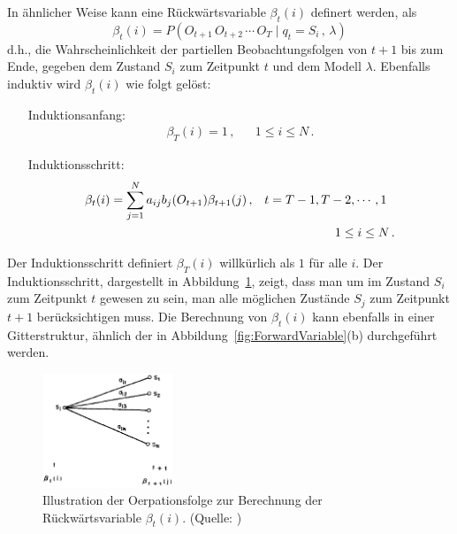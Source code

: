 \newline
In \"ahnlicher Weise kann eine R\"uckw\"artsvariable $\beta_t(i)$ definert werden, als
\begin{equation}
\beta_t(i) = P ( O_{t+1} \, O_{t+2} \, \cdots \, O_T \mid q_t = S_i \, , \, \lambda)
\end{equation}
d.h., die Wahrscheinlichkeit der partiellen Beobachtungsfolgen von $t + 1$ bis zum Ende, gegeben dem Zustand $S_i$ zum Zeitpunkt $t$ und dem Modell $\lambda$.
\newline
Ebenfalls induktiv wird $\beta_t(i)$ wie folgt gel\"ost:
\begin{itemize}
\item[Induktionsanfang:]
\begin{align}
 \beta_T(i) = 1 \, , & & 1 \leq i \leq N \, .
\end{align}
\item[Induktionsschritt:]
\begin{align}
\beta_t(i) = \sum_{j = 1}^{N} a_{ij} b_{j} (O_{t + 1}) \beta_{t + 1} (j) \, , & & t = T - 1, T - 2, \cdots , 1 \, \, \, \,  \notag \\
& & 1 \leq i \leq N \, .
\end{align}
\end{itemize}
Der Induktionsschritt definiert $ \beta_T(i)$ willk\"urlich als $1$ f\"ur alle $i$. Der Induktionsschritt, dargestellt in Abbildung~\ref{fig:BackwardVariable}, zeigt, dass man um im Zustand $S_i$ zum Zeitpunkt $t$ gewesen zu sein, man alle m\"oglichen Zust\"ande $S_j$ zum Zeitpunkt $t + 1$ ber\"ucksichtigen muss.
\newline
Die Berechnung von $\beta_t(i)$ kann ebenfalls in einer Gitterstruktur, \"ahnlich der in Abbildung~\ref{fig:ForwardVariable}(b) durchgef\"uhrt werden.
\begin{figure}[htb]
\centering
\includegraphics[width=0.35\textwidth]{img/markov/backward_variable.png}
\caption[Illustration der Oerpationsfolge zur Berechnung der R\"uckw\"artsvariable.]{Illustration der Oerpationsfolge zur Berechnung der R\"uckw\"artsvariable $\beta_{t}(i)$. (Quelle: )}
\label{fig:BackwardVariable}
\end{figure}

